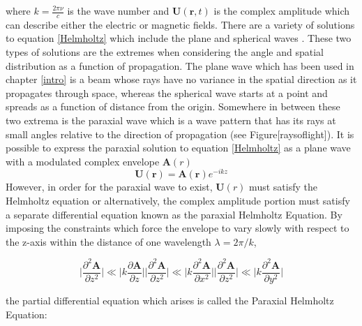 		where $k=\frac{2\pi\nu}{c}$ is the wave number and $\mathbf{U}(\mathbf{r},t)$ is the complex amplitude which can describe either the electric or magnetic fields.  There are a variety of solutions to equation \ref{Helmholtz} which include the plane and spherical waves \cite{Saleh}.  These two types of solutions are the extremes when considering the angle and spatial distribution as a function of propagation.  The plane wave which has been used in chapter \ref{intro} is a beam whose rays have no variance in the spatial direction as it propagates through space, whereas the spherical wave starts at a point and spreads as a function of distance from the origin. Somewhere in between these two extrema is the paraxial wave which is a wave pattern that has its rays at small angles relative to the direction of propagation (see Figure[raysoflight]).  It is possible to express the paraxial solution to equation \ref{Helmholtz} as a plane wave with a modulated complex envelope $\mathbf{A}(r)$
		\begin{equation}
		\mathbf{U}(\mathbf{r}) = \mathbf{A}(\mathbf{r}) e^{-ikz}
		\end{equation}
		However, in order for the paraxial wave to exist, $\mathbf{U}(r)$ must satisfy the Helmholtz equation or alternatively, the complex amplitude portion must satisfy a separate differential equation known as the paraxial Helmholtz Equation. By imposing the constraints which force the envelope to vary slowly with respect to the z-axis within the distance of one wavelength $\lambda = 2\pi/k$,

		\begin{subequations}
		\begin{equation}\label{paraxiala}
		\bigg| { \frac{\partial^2 \mathbf{A}}{\partial z^2} } \bigg|  \ll  \bigg| { k {\frac{\partial\mathbf{A}}{{\partial z}} } } \bigg|
		\end{equation}
		\begin{equation}\label{paraxialb}
		\bigg| { \frac{\partial^2 \mathbf{A}}{\partial z^2} } \bigg|  \ll  \bigg| { k {\frac{\partial^2 \mathbf{A}}{\partial x^2}} } \bigg|
		\end{equation}
		\begin{equation}\label{paraxialc}
		\bigg| { \frac{\partial^2 \mathbf{A}}{\partial z^2} } \bigg|  \ll  \bigg| { k{\frac{\partial^2 \mathbf{A}}{\partial y^2}}} \bigg|
		\end{equation}
		\end{subequations}
		
		the partial differential equation which arises is called the Paraxial Helmholtz Equation:
		
